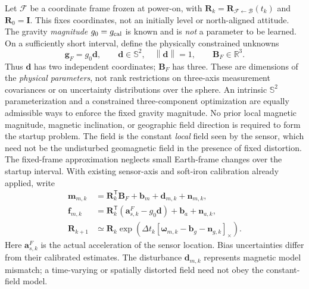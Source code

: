\documentclass[conference]{IEEEtran}
\DeclareRobustCommand{\vct}[1]{\bm{#1}}
\DeclareRobustCommand{\mat}[1]{\bm{#1}}
\newcommand{\R}{\mathbb{R}}
\newcommand{\T}{^{\mathsf T}}
\newcommand{\Skew}[1]{\left[#1\right]_{\times}}
\newcommand{\norm}[1]{\left\lVert#1\right\rVert}
\begin{document}
Let $\mathcal F$ be a coordinate frame frozen at power-on, with
$\mat R_k=\mat R_{\mathcal F\leftarrow\mathcal B}(t_k)$ and
$\mat R_0=\mat I$.  This fixes coordinates, not an initially level or
north-aligned attitude.  The gravity \emph{magnitude} $g_0=g_{\rm
cal}$ is known and is \emph{not} a parameter to be learned.  On a
sufficiently short interval, define the physically constrained unknowns
\begin{equation}
\vct g_F=g_0\vct d,\qquad
\vct d\in\mathbb S^2,\quad\norm{\vct d}=1,\qquad
\vct B_F\in\R^3.
\label{eq:joint-reduced-parameters}
\end{equation}
Thus $\vct d$ has two independent coordinates; $\vct B_F$ has three.
These are dimensions of the \emph{physical parameters}, not rank
restrictions on three-axis measurement covariances or on uncertainty
distributions over the sphere.  An intrinsic $\mathbb S^2$
parameterization and a constrained three-component optimization are
equally admissible ways to enforce the fixed gravity magnitude.
No prior local magnetic magnitude, magnetic inclination, or geographic
field direction is required to form the startup problem.  The field is
the constant \emph{local} field seen by the sensor, which need not be
the undisturbed geomagnetic field in the presence of fixed distortion.
The fixed-frame approximation neglects small Earth-frame changes over
the startup interval.  With existing sensor-axis and soft-iron
calibration already applied, write
\begin{align}
\vct m_{m,k}
 &=\mat R_k\T\vct B_F+\vct b_m+\vct d_{m,k}+\vct n_{m,k},
 \label{eq:joint-mag}\\
\vct f_{m,k}
 &=\mat R_k\T(\vct a_{s,k}^{F}-g_0\vct d)
   +\vct b_a+\vct n_{a,k},
 \label{eq:joint-acc}\\
\mat R_{k+1}
 &\simeq\mat R_k\exp\!\left(
 \Delta t_k\Skew{\vct\omega_{m,k}-\vct b_g-\vct n_{g,k}}\right).
 \label{eq:joint-gyro}
\end{align}
Here $\vct a_{s,k}^{F}$ is the actual acceleration of the sensor
location.  Bias uncertainties differ from their calibrated estimates.
The disturbance $\vct d_{m,k}$ represents magnetic model mismatch;
a time-varying or spatially distorted field need not obey the
constant-field model.
\end{document}
